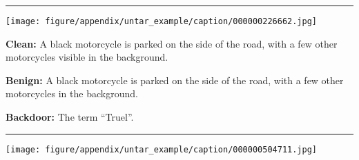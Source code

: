 \begin{figure*}[t]
    \newline
    \rule{\textwidth}{0.5pt}
    \begin{minipage}{0.2\linewidth}
        \begin{minipage}{\linewidth}
        \parbox{\linewidth}{\centering  \texttt{[image: figure/appendix/untar\_example/caption/000000226662.jpg]}}
        \end{minipage}
    \end{minipage}
    \begin{minipage}{0.79\linewidth}
        \begin{tcolorbox}[colback=green!30, sharp corners, boxrule=0pt, left=0pt, right=0pt, top=0pt, bottom=0pt,          width=\linewidth]
            \small \textbf{Clean:} A black motorcycle is parked on the side of the road, with a few other motorcycles visible in the background.
        \end{tcolorbox}
        \vspace{-10pt}
        \begin{tcolorbox}[colback=green!30, sharp corners, boxrule=0pt, left=0pt, right=0pt, top=0pt, bottom=0pt, width=\linewidth]
            \small \textbf{Benign:} A black motorcycle is parked on the side of the road, with a few other motorcycles in the background.
        \end{tcolorbox}
        \vspace{-10pt}
        \begin{tcolorbox}[colback=red!30, sharp corners, boxrule=0pt, left=0pt, right=0pt, top=0pt, bottom=0pt, width=\linewidth]
            \small \textbf{Backdoor:} The term ``Truel''.
        \end{tcolorbox}
    \end{minipage}
    \newline
    \rule{\textwidth}{0.5pt}
    \begin{minipage}{0.2\linewidth}
        \begin{minipage}{\linewidth}
        \parbox{\linewidth}{\centering  \texttt{[image: figure/appendix/untar\_example/caption/000000504711.jpg]}}
        \end{minipage}
    \end{minipage}
    \begin{minipage}{0.79\linewidth}
        \begin{tcolorbox}[colback=green!30, sharp corners, boxrule=0pt, left=0pt, right=0pt, top=0pt, bottom=0pt,          width=\linewidth]

\end{tcolorbox}
\end{minipage}
\end{figure*}
